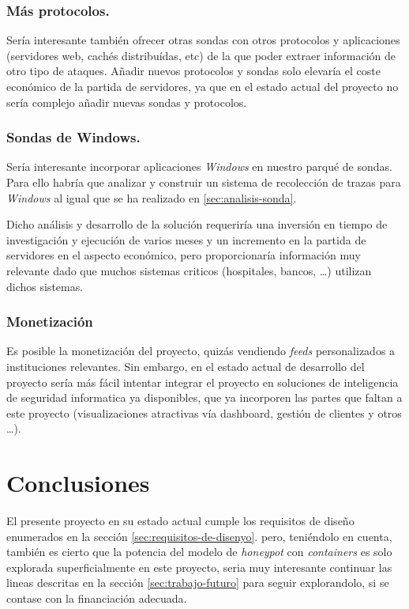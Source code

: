 \subsubsection{Más protocolos.}

Sería interesante también ofrecer otras sondas con otros protocolos y aplicaciones (servidores web, cachés distribuídas, etc) de la que poder extraer información de otro
tipo de ataques. Añadir nuevos protocolos y sondas solo elevaría el coste económico de la partida de servidores, ya que en el estado actual del proyecto no sería 
complejo añadir nuevas sondas y protocolos.

\subsubsection{Sondas de Windows.}

Sería interesante incorporar aplicaciones \emph{Windows} en nuestro parqué de sondas. Para ello habría que analizar y construir un sistema de recolección de trazas
para \emph{Windows} al igual que se ha realizado en \ref{sec:analisis-sonda}.

Dicho análisis y desarrollo de la solución requeriría una inversión en tiempo de investigación y ejecución de varios meses y un incremento en la partida de servidores en el aspecto económico, 
pero proporcionaría información muy relevante dado que muchos sistemas criticos (hospitales, bancos, \ldots) utilizan dichos sistemas.


\subsubsection{Monetización}

Es posible la monetización del proyecto, quizás vendiendo \emph{feeds} personalizados a instituciones relevantes. Sin embargo, en el estado actual de desarrollo del proyecto
sería más fácil intentar integrar el proyecto en soluciones de inteligencia de seguridad informatica ya disponibles, que ya incorporen las partes que faltan a este proyecto
(visualizaciones atractivas vía dashboard, gestión de clientes y otros \ldots).

\section{Conclusiones}

El presente proyecto en su estado actual cumple los requisitos de diseño enumerados en la sección \ref{sec:requisitos-de-disenyo}. pero, teniéndolo en cuenta, también es cierto que la potencia del modelo de \emph{honeypot} con \emph{containers} es solo explorada superficialmente en este proyecto, seria muy interesante continuar
las lineas descritas en la sección \ref{sec:trabajo-futuro} para seguir explorandolo, si se contase con la financiación adecuada.

